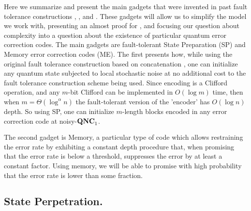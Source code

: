 \documentclass[manuscript,screen,review]{acmart}
\begin{document}
{Here we summarize and present the main gadgets that were invented in past fault tolerance constructions \cite{aharonov1999faulttolerant}, \cite{gottesman2014faulttolerant}, and \cite{grospellier:tel-03364419}. These gadgets will allow us to simplify the model we work with, presenting an almost proof for \CDO, and focusing our question about complexity into a question about the existence of particular quantum error correction codes. The main gadgets are fault-tolerant State Preparation (SP) and Memory error correction codes (ME). The first presents how, while using the original fault tolerance construction based on concatenation \cite{aharonov1999faulttolerant}, one can initialize any quantum state subjected to local stochastic noise at no additional cost to the fault tolerance construction scheme being used. Since encoding is a Clifford operation, and any $m$-bit Clifford can be implemented in $O(\log m)$ time, then when $m =\Theta(\log^{\alpha} n)$ the fault-tolerant version of the 'encoder' has $O(\log n)$ depth. So using SP, one can initialize $m$-length blocks encoded in any error correction code at noisy-$\mathbf{QNC}_{1}{}$.

The second gadget is Memory, a particular type of code which allows restraining the error rate by exhibiting a constant depth procedure that, when promising that the error rate is below a threshold, suppresses the error by at least a constant factor. Using memory, we will be able to promise with high probability that the error rate is lower than some fraction. 

\subsection{State Perpetration.}


}
\end{document}
